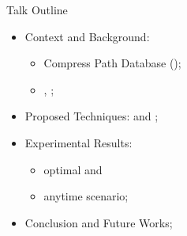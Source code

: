 


    





\begin{frame}{Talk Outline}
    \begin{itemize}
        \item Context and Background:
        \begin{itemize}
            \item Compress Path Database (\CPD{});
            \item \ALT{}, \AWA{};
        \end{itemize}
        \item Proposed Techniques: \CPDSearch{} and \anytimeCPDSearch{};
        \item Experimental Results: 
            \begin{itemize}
                \item optimal and 
                \item anytime scenario;
            \end{itemize}
        \item Conclusion and Future Works;
    \end{itemize}
\end{frame}